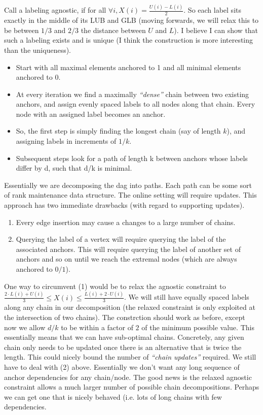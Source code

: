 \documentclass[11pt]{article}
\begin{document}
Call a labeling agnostic, if for all $\forall i, X(i) = \frac{U(i)-L(i)}{2}$. So each label sits exactly in the middle of its LUB and GLB
(moving forwards, we will relax this to be between $1/3$ and $2/3$ the distance between $U$ and $L$).
I believe I can show that such a labeling exists and is unique (I think the construction is more interesting than the uniqueness).
\begin{itemize}
    \item Start with all maximal elements anchored to 1 and all minimal elements anchored to 0.
    \item At every iteration we find a maximally \emph{``dense''} chain between two existing anchors,
          and assign evenly spaced labels to all nodes along that chain. Every node with an assigned label becomes an anchor.
    \item So, the first step is simply finding the longest chain (say of length $k$), and assigning labels in increments of $1/k$.
    \item Subsequent steps look for a path of length k between anchors whose labels differ by d, such that d/k is minimal.
\end{itemize}
Essentially we are decomposing the dag into paths. Each path can be some sort of rank maintenance data structure. The online setting will require updates.
This approach has two immediate drawbacks (with regard to supporting updates).
\begin{enumerate}
    \item Every edge insertion may cause a changes to a large number of chains.
    \item Querying the label of a vertex will require querying the label of the associated anchors.
          This will require querying the label of another set of anchors and so on until we reach the extremal nodes (which are always anchored to $0/1$).
\end{enumerate}
One way to circumvent (1) would be to relax the agnostic constraint to $\frac{2\cdot L(i) + U(i)}{3}\le X(i) \le \frac{L(i) + 2\cdot U(i)}{3}$.
We will still have equally spaced labels along any chain in our decomposition (the relaxed constraint is only exploited at the intersection of two chains).
The constrction should work as before, except now we allow $d/k$ to be within a factor of $2$ of the minimum possible value.
This essentially means that we can have sub-optimal chains.
Concretely, any given chain only needs to be updated once there is an alternative that is twice the length.
This could nicely bound the number of \emph{``chain updates''} required.
We still have to deal with (2) above. Essentially we don't want any long sequence of anchor dependencies for any chain/node.
The good news is the relaxed agnostic constraint allows a much larger number of possible chain decompositions.
Perhaps we can get one that is nicely behaved (i.e. lots of long chains with few dependencies.
\end{document}
